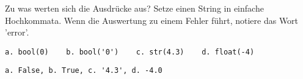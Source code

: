 \question[2]
Zu was werten sich die Ausdrücke aus? Setze einen String in einfache Hochkommata.
Wenn die Auswertung zu einem Fehler führt, notiere das
Wort 'error'.

\begin{lstlisting}
a. bool(0)    b. bool('0')    c. str(4.3)    d. float(-4)
\end{lstlisting}
\begin{solutionbox}{2cm}
\begin{lstlisting}
a. False, b. True, c. '4.3', d. -4.0
\end{lstlisting}
\end{solutionbox}
